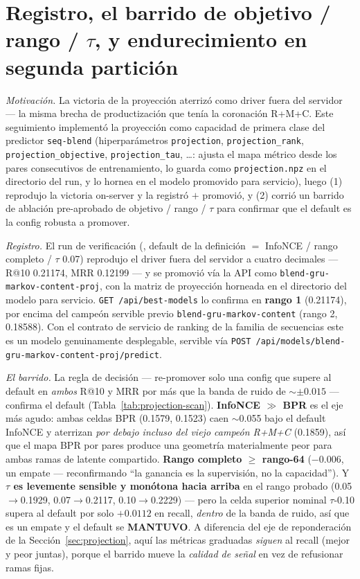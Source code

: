 \documentclass[11pt]{article}
\newcommand{\runid}[1]{\texttt{\small\seqsplit{#1}}}
\begin{document}
\section{Registro, el barrido de objetivo / rango / $\tau$, y endurecimiento en segunda partición}
\label{sec:projection-scan}
\emph{Motivación.} La victoria de la proyección aterrizó como driver fuera del
servidor --- la misma brecha de productización que tenía la coronación R+M+C. Este
seguimiento implementó la proyección como capacidad de primera clase del predictor
\texttt{seq-blend} (hiperparámetros \texttt{projection}, \texttt{projection\_rank},
\texttt{projection\_objective}, \texttt{projection\_tau}, \dots: ajusta el mapa
métrico desde los pares consecutivos de entrenamiento, lo guarda como
\texttt{projection.npz} en el directorio del run, y lo hornea en el modelo promovido
para servicio), luego (1) reprodujo la victoria on-server y la registró $+$ promovió,
y (2) corrió un barrido de ablación pre-aprobado de objetivo / rango / $\tau$ para
confirmar que el default es la config robusta a promover.

\emph{Registro.} El run de verificación
(\runid{run-20260718-191539-1b89c-seq-blend}, default de la definición $=$ InfoNCE /
rango completo / $\tau$ \num{0.07}) reprodujo el driver fuera del servidor a cuatro
decimales --- R@10 \num{0.21174}, MRR \num{0.12199} --- y se promovió vía la API como
\texttt{blend-gru-markov-content-proj}, con la matriz de proyección horneada en el
directorio del modelo para servicio. \texttt{GET /api/best-models} lo confirma en
\textbf{rango 1} (\num{0.21174}), por encima del campeón servible previo
\texttt{blend-gru-markov-content} (rango 2, \num{0.18588}). Con el contrato de
servicio de ranking de la familia de secuencias este es un modelo genuinamente
desplegable, servible vía \texttt{POST /api/models/blend-gru-markov-content-proj/predict}.

\emph{El barrido.} La regla de decisión --- re-promover solo una config que supere
al default en \emph{ambos} R@10 y MRR por más que la banda de ruido de
$\sim$$\pm\num{0.015}$ --- confirma el default (Tabla~\ref{tab:projection-scan}).
\textbf{InfoNCE $\gg$ BPR} es el eje más agudo: ambas celdas BPR (\num{0.1579},
\num{0.1523}) caen $\sim$\num{0.055} bajo el default InfoNCE y aterrizan \emph{por
debajo incluso del viejo campeón R+M+C} (\num{0.1859}), así que el mapa BPR por
pares produce una geometría materialmente peor para ambas ramas de latente
compartido. \textbf{Rango completo $\ge$ rango-64} ($-\num{0.006}$, un empate ---
reconfirmando ``la ganancia es la supervisión, no la capacidad''). Y \textbf{$\tau$
es levemente sensible y monótona hacia arriba} en el rango probado
(\num{0.05}$\to$\num{0.1929}, \num{0.07}$\to$\num{0.2117},
\num{0.10}$\to$\num{0.2229}) --- pero la celda superior nominal $\tau$-\num{0.10}
supera al default por solo $+\num{0.0112}$ en recall, \emph{dentro} de la banda de
ruido, así que es un empate y el default se \textbf{MANTUVO}. A diferencia del eje
de reponderación de la Sección~\ref{sec:projection}, aquí las métricas graduadas
\emph{siguen} al recall (mejor y peor juntas), porque el barrido mueve la
\emph{calidad de señal} en vez de refusionar ramas fijas.
\end{document}
